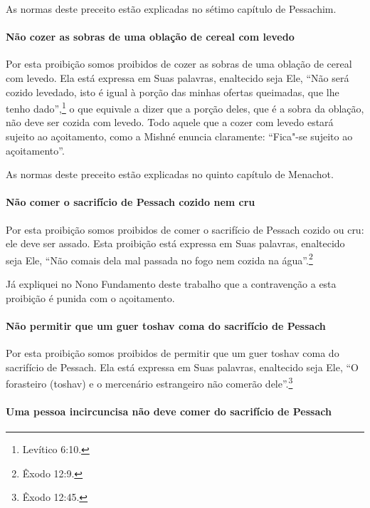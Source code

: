 \begin{multicols}{2}
As normas deste preceito estão explicadas no sétimo capítulo de Pessachim\starr.

\paragraph{Não cozer as sobras de uma oblação de cereal com levedo}

Por esta proibição somos proibidos de cozer as sobras de uma oblação de
cereal com levedo. Ela está expressa em Suas palavras, enaltecido seja
Ele, ``Não será cozido levedado, isto é igual à porção das minhas
ofertas queimadas, que lhe tenho dado'',\footnote{Levítico 6:10.} o que equivale
a dizer que a porção deles, que é a sobra da oblação, não deve ser
cozida com levedo. Todo aquele que a cozer com levedo estará sujeito ao
açoitamento, como a Mishné enuncia claramente: ``Fica"-se sujeito ao
açoitamento''.

As normas deste preceito estão explicadas no quinto capítulo de Menachot\starr.

\paragraph{Não comer o sacrifício de Pessach\starr{} cozido nem cru}

Por esta proibição somos proibidos de comer o sacrifício de Pessach\starr{}
cozido ou cru: ele deve ser assado. Esta proibição está expressa em Suas
palavras, enaltecido seja Ele, ``Não comais dela mal passada no fogo nem
cozida na água''.\footnote{Êxodo 12:9.}

Já expliquei no Nono Fundamento deste trabalho que a contravenção a
esta proibição é punida com o açoitamento.

\paragraph{Não permitir que um guer toshav\starr{} coma do sacrifício de Pessach\starr{}}

Por esta proibição somos proibidos de permitir que um guer toshav\starr{} coma do sacrifício de Pessach\starr. Ela
está expressa em Suas palavras, enaltecido seja Ele, ``O forasteiro
(toshav\starr) e o mercenário estrangeiro não comerão dele''.\footnote{Êxodo 12:45.}

\paragraph{Uma pessoa incircuncisa não deve comer do sacrifício de Pessach\starr{}}


\end{multicols}

